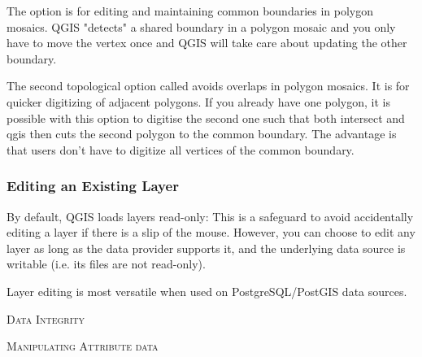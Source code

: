 
The option  is for editing and maintaining 
common boundaries in polygon mosaics. QGIS "detects" a shared boundary in 
a polygon mosaic and you only have to move the vertex once and QGIS will take 
care about updating the other boundary.


The second topological option called  
avoids overlaps in polygon mosaics. It is for quicker digitizing of adjacent polygons. 
If you already have one polygon, it is possible with this option to digitise the second 
one such that both intersect and qgis then cuts the second polygon to the common boundary. 
The advantage is that users don't have to digitize all vertices of the common boundary.

\subsubsection{Editing an Existing Layer}
\label{sec:edit_existing_layer}

By default, QGIS loads layers read-only: This is a safeguard
to avoid accidentally editing a layer if there is a slip of the mouse.
However, you can choose to edit any layer as long as the data provider supports it,
and the underlying data source is writable (i.e. its files are not read-only).

Layer editing is most versatile when used on PostgreSQL/PostGIS data sources. 

\begin{Tip}[ht]\caption{\textsc{Data Integrity}}
\end{Tip}

\begin{Tip}[ht]\caption{\textsc{Manipulating Attribute data}}
\end{Tip}

